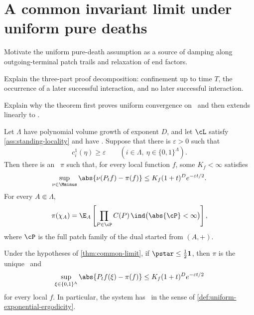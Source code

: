 \section{A common invariant limit under uniform pure deaths}
\label{sec:common-limit}

\begin{discussion}
  \item Motivate the uniform pure-death assumption as a source of
  damping along outgoing-terminal patch trails and relaxation of end
  factors.
  \item Explain the three-part proof decomposition: confinement up to
  time \(T\), the occurrence of a later successful interaction, and no
  later successful interaction.
  \item Explain why the theorem first proves uniform convergence on
  \Mstar\ and then extends linearly to \Mminus.
\end{discussion}

\begin{theorem}
\label{thm:common-limit}
Let \(\Lambda\) have polynomial volume growth of exponent \(D\), and
let \(\cL\) satisfy \cref{ass:standing-locality} and have
\patchpositivity. Suppose that there is \(\varepsilon>0\) such that
\begin{equation}
  c_i^1(\eta)\ge\varepsilon
  \qquad
  (i\in\Lambda,\ \eta\in\{0,1\}^{\Lambda}).
  \label{eq:uniform-death}
\end{equation}
Then there is an \invariantmeasure\ \(\pi\) such that, for every local
function \(f\), some \(K_f<\infty\) satisfies
\begin{equation}
  \sup_{\nu\in\Mminus}
  \abs{\nu(P_tf)-\pi(f)}
  \le
  K_f(1+t)^D e^{-\varepsilon t/2}.
  \label{eq:common-limit-bound}
\end{equation}
For every \(A\Subset\Lambda\),
\begin{equation}
  \pi(\chi_A)
  =
  \E_A\left[
    \prod_{P\in\cP}C(P)\,
    \ind\bigl(\abs{\cP}<\infty\bigr)
  \right],
  \label{eq:limit-moment-formula}
\end{equation}
where \(\cP\) is the full patch family of the dual started from
\((A,+)\).
\end{theorem}

\begin{corollary}[\uniformexponentialergodicity]
\label{cor:uniform-ergodicity}
Under the hypotheses of \cref{thm:common-limit}, if
\(\pstar\le\frac12\mathbf1\), then \(\pi\) is the unique
\invariantmeasure\ and
\[
  \sup_{\xi\in\{0,1\}^{\Lambda}}
  \abs{P_tf(\xi)-\pi(f)}
  \le
  K_f(1+t)^D e^{-\varepsilon t/2}
\]
for every local \(f\). In particular, the system has
\uniformexponentialergodicity\ in the sense of
\cref{def:uniform-exponential-ergodicity}.
\end{corollary}


